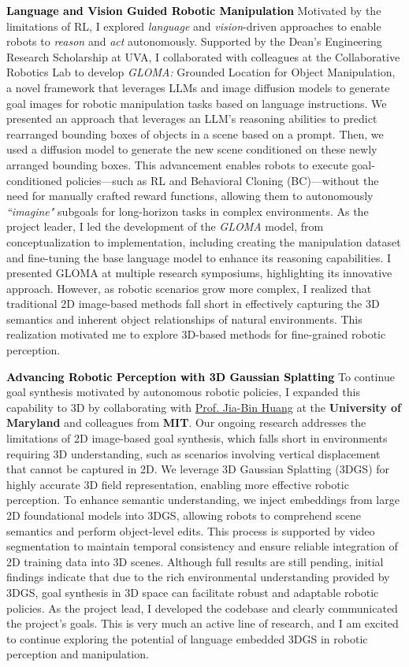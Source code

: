 \documentclass[10pt]{article}
\newcommand{\statement}[1]{\medskip\noindent
  \textcolor{black}{\textbf{#1}}\space
}
\begin{document}
\statement{Language and Vision Guided Robotic Manipulation} Motivated by the limitations of RL, I explored \textit{language} and \textit{vision}-driven approaches to enable robots to \textit{reason} and \textit{act} autonomously. Supported by the Dean's Engineering Research Scholarship at UVA, I collaborated with colleagues at the Collaborative Robotics Lab to develop \textit{GLOMA:} Grounded Location for Object Manipulation, a novel framework that leverages LLMs and image diffusion models to generate goal images for robotic manipulation tasks based on language instructions. We presented an approach that leverages an LLM's reasoning abilities to predict rearranged bounding boxes of objects in a scene based on a prompt. Then, we used a diffusion model to generate the new scene conditioned on these newly arranged bounding boxes. This advancement enables robots to execute goal-conditioned policies—such as RL and Behavioral Cloning (BC)—without the need for manually crafted reward functions, allowing them to autonomously \textit{``imagine"} subgoals for long-horizon tasks in complex environments. As the project leader, I led the development of the \textit{GLOMA} model, from conceptualization to implementation, including creating the manipulation dataset and fine-tuning the base language model to enhance its reasoning capabilities. I presented GLOMA at multiple research symposiums, highlighting its innovative approach. However, as robotic scenarios grow more complex, I realized that traditional 2D image-based methods fall short in effectively capturing the 3D semantics and inherent object relationships of natural environments. This realization motivated me to explore 3D-based methods for fine-grained robotic perception.

\statement{Advancing Robotic Perception with 3D Gaussian Splatting} To continue goal synthesis motivated by autonomous robotic policies, I expanded this capability to 3D by collaborating with \href{https://jbhuang0604.github.io/}{Prof. Jia-Bin Huang} at the \textbf{University of Maryland} and colleagues from \textbf{MIT}. Our ongoing research addresses the limitations of 2D image-based goal synthesis, which falls short in environments requiring 3D understanding, such as scenarios involving vertical displacement that cannot be captured in 2D. We leverage 3D Gaussian Splatting (3DGS) for highly accurate 3D field representation, enabling more effective robotic perception. To enhance semantic understanding, we inject embeddings from large 2D foundational models into 3DGS, allowing robots to comprehend scene semantics and perform object-level edits. This process is supported by video segmentation to maintain temporal consistency and ensure reliable integration of 2D training data into 3D scenes. Although full results are still pending, initial findings indicate that due to the rich environmental understanding provided by 3DGS, goal synthesis in 3D space can facilitate robust and adaptable robotic policies. As the project lead, I developed the codebase and clearly communicated the project's goals. This is very much an active line of research, and I am excited to continue exploring the potential of language embedded 3DGS in robotic perception and manipulation.
\end{document}
